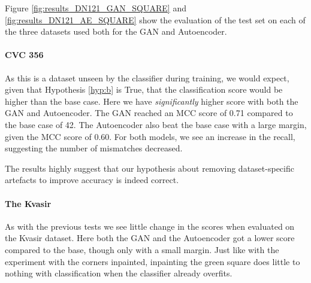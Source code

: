 \noindent Figure \ref{fig:results_DN121_GAN_SQUARE} and \ref{fig:results_DN121_AE_SQUARE} show the evaluation of the test set on each of the three datasets used both for the GAN and Autoencoder. 

\paragraph{CVC 356}
As this is a dataset unseen by the classifier during training, we would expect, given that Hypothesis \ref{hyp:b} is True, that the classification score would be higher than the base case.
Here we have \textit{significantly} higher score with both the GAN and Autoencoder. 
The GAN reached an MCC score of 0.71 compared to the base case of 42. The Autoencoder also beat the base case with a large margin, given the MCC score of 0.60. 
For both models, we see an increase in the recall, suggesting the number of mismatches decreased.

The results highly suggest that our hypothesis about removing dataset-specific artefacts to improve accuracy is indeed correct. 

\paragraph{The Kvasir}
As with the previous tests we see little change in the scores when evaluated on the Kvasir dataset.
Here both the GAN and the Autoencoder got a lower score compared to the base, though only with a small margin. Just like with the experiment with the corners inpainted, inpainting the green square does little to nothing with classification when the classifier already overfits.


